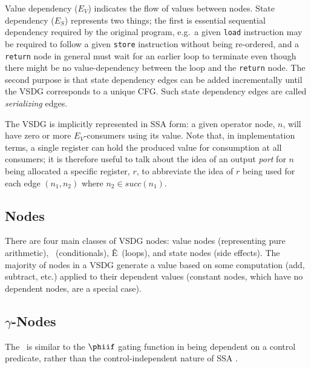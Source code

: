 Value dependency ($E_V$) indicates the flow of values between nodes. 
State dependency ($E_S$) represents two things; 
the first is essential sequential dependency required by the original program, e.g.~a given \texttt{load} instruction may be required to follow a given \texttt{store} instruction without being re-ordered, and a \texttt{return} node in general must wait for an earlier loop to terminate even though there might be no value-dependency between the loop and the \texttt{return} node. 
The second purpose is that state dependency edges can be added incrementally until the VSDG corresponds to a unique CFG. 
Such state dependency edges are called {\em serializing} edges.

The VSDG is implicitly represented in SSA form: 
a given operator node, $n$, will have zero or more $E_V$-consumers using its value. 
Note that, in implementation terms, a single register can hold the produced value for consumption at all consumers; 
it is therefore useful to talk about the idea of an output {\em port} for $n$ being allocated a specific register, $r$, to abbreviate the idea of $r$ being used for each edge $(n_1,n_2)$ where $n_2 \in \textit{succ}(n_1)$.


\subsection{Nodes}
There are four main classes of VSDG nodes: 
value nodes (representing pure arithmetic), \Gns\ (conditionals), Ê\Tns\ (loops), and state nodes (side effects). 
The majority of nodes in a VSDG generate a value based on some computation (add, subtract, etc.) applied to their dependent values (constant nodes, which have no dependent nodes, are a special case).



\subsection{$\gamma$-Nodes}

The \Gn\ is similar to the $\phiif$ gating function in being dependent on a control predicate, rather than the control-independent nature of SSA \phifuns.
%

